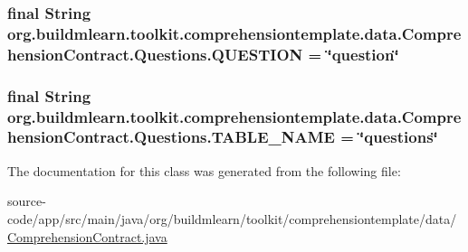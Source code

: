 \subsubsection[{\texorpdfstring{Q\+U\+E\+S\+T\+I\+ON}{QUESTION}}]{\setlength{\rightskip}{0pt plus 5cm}final String org.\+buildmlearn.\+toolkit.\+comprehensiontemplate.\+data.\+Comprehension\+Contract.\+Questions.\+Q\+U\+E\+S\+T\+I\+ON = \char`\"{}question\char`\"{}\hspace{0.3cm}{\ttfamily [static]}}\hypertarget{classorg_1_1buildmlearn_1_1toolkit_1_1comprehensiontemplate_1_1data_1_1ComprehensionContract_1_1Questions_a2bf09c11bad641f97b137431e67a7e90}{}\label{classorg_1_1buildmlearn_1_1toolkit_1_1comprehensiontemplate_1_1data_1_1ComprehensionContract_1_1Questions_a2bf09c11bad641f97b137431e67a7e90}
\subsubsection[{\texorpdfstring{T\+A\+B\+L\+E\+\_\+\+N\+A\+ME}{TABLE_NAME}}]{\setlength{\rightskip}{0pt plus 5cm}final String org.\+buildmlearn.\+toolkit.\+comprehensiontemplate.\+data.\+Comprehension\+Contract.\+Questions.\+T\+A\+B\+L\+E\+\_\+\+N\+A\+ME = \char`\"{}questions\char`\"{}\hspace{0.3cm}{\ttfamily [static]}}\hypertarget{classorg_1_1buildmlearn_1_1toolkit_1_1comprehensiontemplate_1_1data_1_1ComprehensionContract_1_1Questions_a456ddf85dc78182f393cfb1197d1e8f2}{}\label{classorg_1_1buildmlearn_1_1toolkit_1_1comprehensiontemplate_1_1data_1_1ComprehensionContract_1_1Questions_a456ddf85dc78182f393cfb1197d1e8f2}


The documentation for this class was generated from the following file\+:\begin{DoxyCompactItemize}
\item 
source-\/code/app/src/main/java/org/buildmlearn/toolkit/comprehensiontemplate/data/\hyperlink{ComprehensionContract_8java}{Comprehension\+Contract.\+java}\end{DoxyCompactItemize}
